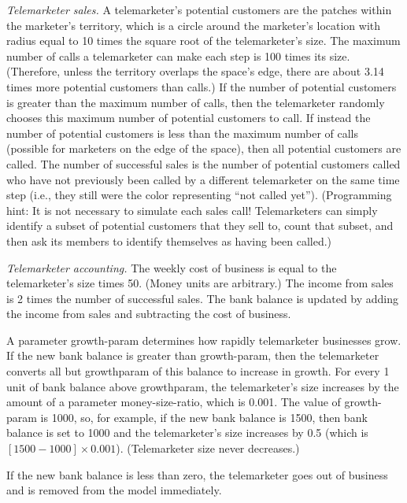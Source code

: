 \documentclass[]{article}
\begin{document}
\emph{Telemarketer sales.} A telemarketer's potential customers are the
patches within the marketer's territory, which is a circle around the
marketer's location with radius equal to 10 times the square root of the
telemarketer's size. The maximum number of calls a telemarketer can make
each step is 100 times its size. (Therefore, unless the territory
overlaps the space's edge, there are about 3.14 times more potential
customers than calls.) If the number of potential customers is greater
than the maximum number of calls, then the telemarketer randomly chooses
this maximum number of potential customers to call. If instead the
number of potential customers is less than the maximum number of calls
(possible for marketers on the edge of the space), then all potential
customers are called. The number of successful sales is the number of
potential customers called who have not previously been called by a
different telemarketer on the same time step (i.e., they still were the
color representing ``not called yet''). (Programming hint: It is not
necessary to simulate each sales call! Telemarketers can simply identify
a subset of potential customers that they sell to, count that subset,
and then ask its members to identify themselves as having been called.)

\emph{Telemarketer accounting.} The weekly cost of business is equal to
the telemarketer's size times 50. (Money units are arbitrary.) The
income from sales is 2 times the number of successful sales. The bank
balance is updated by adding the income from sales and subtracting the
cost of business.

A parameter growth-param determines how rapidly telemarketer businesses
grow. If the new bank balance is greater than growth-param, then the
telemarketer converts all but growthparam of this balance to increase in
growth. For every 1 unit of bank balance above growthparam, the
telemarketer's size increases by the amount of a parameter
money-size-ratio, which is 0.001. The value of growth-param is 1000, so,
for example, if the new bank balance is 1500, then bank balance is set
to 1000 and the telemarketer's size increases by 0.5 (which is $[1500 -
1000] \times 0.001$). (Telemarketer size never decreases.)

If the new bank balance is less than zero, the telemarketer goes out of
business and is removed from the model immediately.
\end{document}
